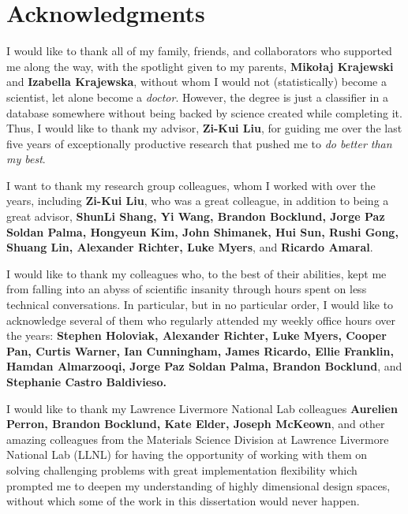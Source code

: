 \documentclass[letterpaper, 12pt]{report}
\begin{document}
\newpage
\tableofcontents

\newpage
{}
\renewcommand{\listfigurename}{List of Figures}
\listoffigures

\newpage
{}
\renewcommand{\listtablename}{List of Tables}
\listoftables

\newpage
\chapter*{Acknowledgments}
\label{acknowledgments}

I would like to thank all of my family, friends, and collaborators who supported me along the way, with the spotlight given to my parents, \textbf{Mikołaj Krajewski} and \textbf{Izabella Krajewska}, without whom I would not (statistically) become a scientist, let alone become a \emph{doctor}. However, the degree is just a classifier in a database somewhere without being backed by science created while completing it. Thus, I would like to thank my advisor, \textbf{Zi-Kui Liu}, for guiding me over the last five years of exceptionally productive research that pushed me to \emph{do better than my best}.

I want to thank my research group colleagues, whom I worked with over the years, including \textbf{Zi-Kui Liu}, who was a great colleague, in addition to being a great advisor, \textbf{ShunLi Shang, Yi Wang, Brandon Bocklund, Jorge Paz Soldan Palma, Hongyeun Kim, John Shimanek, Hui Sun, Rushi Gong, Shuang Lin, Alexander Richter, Luke Myers}, and \textbf{Ricardo Amaral}.

I would like to thank my colleagues who, to the best of their abilities, kept me from falling into an abyss of scientific insanity through hours spent on less technical conversations. In particular, but in no particular order, I would like to acknowledge several of them who regularly attended my weekly office hours over the years: \textbf{Stephen Holoviak, Alexander Richter, Luke Myers, Cooper Pan, Curtis Warner, Ian Cunningham, James Ricardo, Ellie Franklin, Hamdan Almarzooqi, Jorge Paz Soldan Palma, Brandon Bocklund}, and \textbf{Stephanie Castro Baldivieso.}

I would like to thank my Lawrence Livermore National Lab colleagues \textbf{Aurelien Perron, Brandon Bocklund, Kate Elder, Joseph McKeown}, and other amazing colleagues from the Materials Science Division at Lawrence Livermore National Lab (LLNL) for having the opportunity of working with them on solving challenging problems with great implementation flexibility which prompted me to deepen my understanding of highly dimensional design spaces, without which some of the work in this dissertation would never happen.
\end{document}
